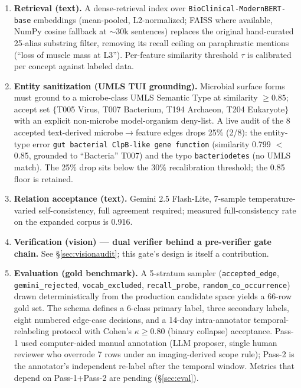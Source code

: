 \documentclass[10pt,twocolumn,letterpaper]{article}
\begin{document}
\begin{enumerate}
\item \textbf{Retrieval (text).} A dense-retrieval index over
\texttt{BioClinical-ModernBERT-base} embeddings (mean-pooled, L2-normalized;
FAISS where available, NumPy cosine fallback at $\sim$30k sentences) replaces
the original hand-curated 25-alias substring filter, removing its recall
ceiling on paraphrastic mentions (``loss of muscle mass at L3''). Per-feature
similarity threshold $\tau$ is calibrated per concept against labeled data.

\item \textbf{Entity sanitization (UMLS TUI grounding).} Microbial surface
forms must ground to a microbe-class UMLS Semantic Type at similarity
$\geq 0.85$; accept set $\{$T005 Virus, T007 Bacterium, T194 Archaeon, T204
Eukaryote$\}$ with an explicit non-microbe model-organism deny-list. A live
audit of the 8 accepted text-derived microbe$\rightarrow$feature edges drops
25\% (2/8): the entity-type error \texttt{gut bacterial ClpB-like gene
function} (similarity 0.799 $<$ 0.85, grounded to ``Bacteria'' T007) and the
typo \texttt{bacteriodetes} (no UMLS match). The 25\% drop sits below the
30\% recalibration threshold; the 0.85 floor is retained.

\item \textbf{Relation acceptance (text).} Gemini 2.5 Flash-Lite,
7-sample temperature-varied self-consistency, full agreement required;
measured full-consistency rate on the expanded corpus is 0.916.

\item \textbf{Verification (vision) --- dual verifier behind a
pre-verifier gate chain.} See \S\ref{sec:visionaudit}; this gate's design is
itself a contribution.

\item \textbf{Evaluation (gold benchmark).} A 5-stratum sampler
(\texttt{accepted\_edge}, \texttt{gemini\_rejected}, \texttt{vocab\_excluded},
\texttt{recall\_probe}, \texttt{random\_co\_occurrence}) drawn deterministically
from the production candidate space yields a 66-row gold set. The schema
defines a 6-class primary label, three secondary labels, eight numbered
edge-case decisions, and a 14-day intra-annotator temporal-relabeling
protocol with Cohen's $\kappa \geq 0.80$ (binary collapse) acceptance.
Pass-1 used computer-aided manual annotation (LLM proposer, single human
reviewer who overrode 7 rows under an imaging-derived scope rule); Pass-2 is
the annotator's independent re-label after the temporal window. Metrics that
depend on Pass-1+Pass-2 are pending (\S\ref{sec:eval}).
\end{enumerate}
\end{document}
